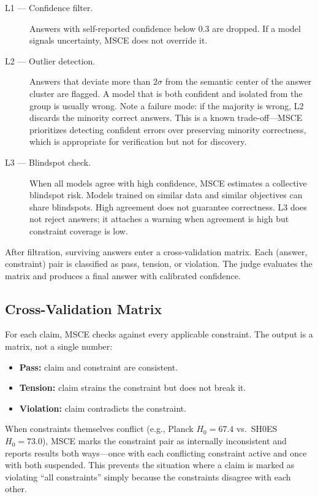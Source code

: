 \documentclass[11pt,a4paper]{article}
\begin{document}
\begin{description}
\item[L1 --- Confidence filter.] Answers with self-reported confidence below 0.3 are dropped. If a model signals uncertainty, MSCE does not override it.

\item[L2 --- Outlier detection.] Answers that deviate more than $2\sigma$ from the semantic center of the answer cluster are flagged. A model that is both confident and isolated from the group is usually wrong. Note a failure mode: if the majority is wrong, L2 discards the minority correct answers. This is a known trade-off---MSCE prioritizes detecting confident errors over preserving minority correctness, which is appropriate for verification but not for discovery.

\item[L3 --- Blindspot check.] When all models agree with high confidence, MSCE estimates a collective blindspot risk. Models trained on similar data and similar objectives can share blindspots. High agreement does not guarantee correctness. L3 does not reject answers; it attaches a warning when agreement is high but constraint coverage is low.
\end{description}

After filtration, surviving answers enter a cross-validation matrix. Each (answer, constraint) pair is classified as pass, tension, or violation. The judge evaluates the matrix and produces a final answer with calibrated confidence.

\subsection{Cross-Validation Matrix}

For each claim, MSCE checks against every applicable constraint. The output is a matrix, not a single number:

\begin{itemize}
    \item \textbf{Pass:} claim and constraint are consistent.
    \item \textbf{Tension:} claim strains the constraint but does not break it.
    \item \textbf{Violation:} claim contradicts the constraint.
\end{itemize}

When constraints themselves conflict (e.g., Planck $H_0 = 67.4$ vs.\ SH0ES $H_0 = 73.0$), MSCE marks the constraint pair as internally inconsistent and reports results both ways---once with each conflicting constraint active and once with both suspended. This prevents the situation where a claim is marked as violating ``all constraints'' simply because the constraints disagree with each other.
\end{document}
